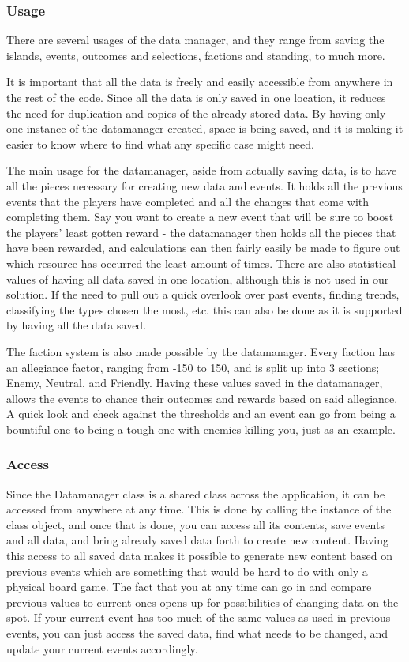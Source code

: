 \subsubsection{Usage}

There are several usages of the data manager, and they range from saving the islands, events, outcomes and selections, factions and standing, to much more.

It is important that all the data is freely and easily accessible from anywhere in the rest of the code. Since all the data is only saved in one location, it reduces the need for duplication and copies of the already stored data. By having only one instance of the datamanager created, space is being saved, and it is making it easier to know where to find what any specific case might need.

The main usage for the datamanager, aside from actually saving data, is to have all the pieces necessary for creating new data and events. It holds all the previous events that the players have completed and all the changes that come with completing them. Say you want to create a new event that will be sure to boost the players' least gotten reward - the datamanager then holds all the pieces that have been rewarded, and calculations can then fairly easily be made to figure out which resource has occurred the least amount of times.
There are also statistical values of having all data saved in one location, although this is not used in our solution. If the need to pull out a quick overlook over past events, finding trends, classifying the types chosen the most, etc. this can also be done as it is supported by having all the data saved.

The faction system is also made possible by the datamanager. Every faction has an allegiance factor, ranging from -150 to 150, and is split up into 3 sections; Enemy, Neutral, and Friendly. Having these values saved in the datamanager, allows the events to chance their outcomes and rewards based on said allegiance. A quick look and check against the thresholds and an event can go from being a bountiful one to being a tough one with enemies killing you, just as an example.

\subsubsection{Access}
Since the Datamanager class is a shared class across the application, it can be accessed from anywhere at any time. This is done by calling the instance of the class object, and once that is done, you can access all its contents, save events and all data, and bring already saved data forth to create new content. Having this access to all saved data makes it possible to generate new content based on previous events which are something that would be hard to do with only a physical board game. 
The fact that you at any time can go in and compare previous values to current ones opens up for possibilities of changing data on the spot. If your current event has too much of the same values as used in previous events, you can just access the saved data, find what needs to be changed, and update your current events accordingly.	

